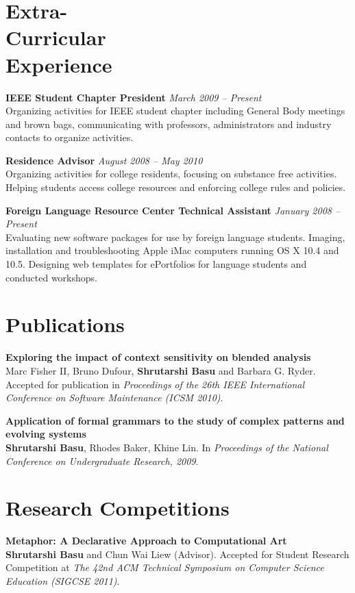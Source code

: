 \documentclass[margin,line]{resume}
\begin{document}
\begin{resume}
    \section{\mysidestyle Extra-\\Curricular\\Experience} 
    
    {\bf IEEE Student Chapter President} \hfill {\sl March 2009 -- Present} \\
    Organizing activities for IEEE student chapter including General Body meetings and brown bags,
    communicating with professors, administrators and industry contacts to organize activities. 

    {\bf Residence Advisor} \hfill {\sl August 2008 -- May 2010} \\
    Organizing activities for college residents, focusing on substance free activities. 
    Helping students access college resources and enforcing college rules and policies.

    {\bf Foreign Language Resource Center Technical Assistant} \hfill {\sl January 2008 -- Present}\\
    Evaluating new software packages for use by foreign language students.
    Imaging, installation and troubleshooting Apple iMac computers running OS X 10.4 and 10.5.
    Designing web templates for ePortfolios for language students and conducted workshops.

    \section{\mysidestyle Publications}
    {\bf Exploring the impact of context sensitivity on blended analysis} \\
    Marc Fisher II, Bruno Dufour, {\bf Shrutarshi Basu} and Barbara G. Ryder.
    Accepted for publication in \emph{Proceedings of the 26th IEEE International Conference
      on Software Maintenance (ICSM 2010)}.
    
    {\bf Application of formal grammars to the study of complex patterns and evolving systems}\\
    {\bf Shrutarshi Basu}, Rhodes Baker, Khine Lin. In \emph{Proceedings of the National Conference on
    Undergraduate Research, 2009}.

    \section{\mysidestyle Research Competitions}
    {\bf Metaphor: A Declarative Approach to Computational Art} \\
    {\bf Shrutarshi Basu} and Chun Wai Liew (Advisor). 
    Accepted for Student Research Competition at \emph{The 42nd ACM Technical
      Symposium on Computer Science Education (SIGCSE 2011)}.


\end{resume}
\end{document}
